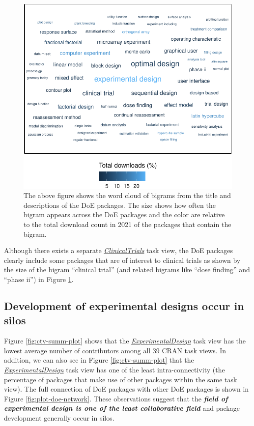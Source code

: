 \documentclass{article}
\begin{document}
\begin{figure}[htbp]

{\centering \includegraphics{figures/wordcloud-over-time-1} 

}

\caption{The above figure shows the word cloud of bigrams from the title and descriptions of the DoE packages. The size shows how often the bigram appears across the DoE packages and the color are relative to the total download count in 2021 of the packages that contain the bigram.}\label{fig:wordcloud-over-time}
\end{figure}

Although there exists a separate
\href{http://CRAN.R-project.org/view=ClinicalTrials}{\emph{ClinicalTrials}}
task view, the DoE packages clearly include some packages that are of
interest to clinical trials as shown by the size of the bigram
``clinical trial'' (and related bigrams like ``dose finding'' and
``phase ii'') in Figure \ref{fig:wordcloud-over-time}.

\hypertarget{silo}{%
\subsection{Development of experimental designs occur in
silos}\label{silo}}

Figure \ref{fig:ctv-summ-plot} shows that the
\href{http://CRAN.R-project.org/view=ExperimentalDesign}{\emph{ExperimentalDesign}}
task view has the lowest average number of contributors among all 39
CRAN task views. In addition, we can also see in Figure
\ref{fig:ctv-summ-plot} that the
\href{http://CRAN.R-project.org/view=ExperimentalDesign}{\emph{ExperimentalDesign}}
task view has one of the least intra-connectivity (the percentage of
packages that make use of other packages within the same task view). The
full connection of DoE packages with other DoE packages is shown in
Figure \ref{fig:plot-doe-network}. These observations suggest that the
\textbf{\emph{field of experimental design is one of the least
collaborative field}} and package development generally occur in silos.
\end{document}
